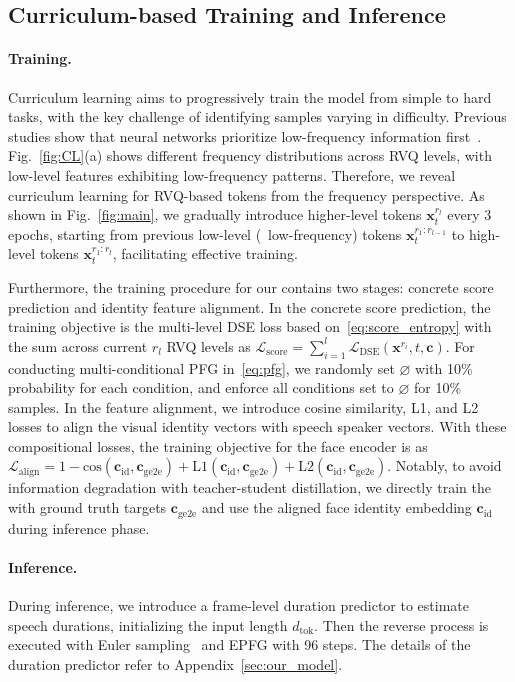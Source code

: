 \subsection{Curriculum-based Training and Inference}
\label{subsec:training}
\paragraph{Training.~~\xspace}
Curriculum learning aims to progressively train the model from simple to hard tasks, with the key challenge of identifying samples varying in difficulty.
Previous studies show that neural networks prioritize low-frequency information first~\cite{lowfreq_DBLP:conf/icml/RahamanBADLHBC19}. Fig.~\ref{fig:CL}(a) shows different frequency distributions across RVQ levels, with low-level features exhibiting low-frequency patterns. 
Therefore, we reveal curriculum learning for RVQ-based tokens from the frequency perspective. As shown in Fig.~\ref{fig:main}, we gradually introduce higher-level tokens $\bm{x}^{r_l}_t$ every 3 epochs, starting from previous low-level (\ie~low-frequency) tokens $\bm{x}^{r_1:r_{l-1}}_t$ to high-level tokens $\bm{x}^{r_1:r_l}_t$, facilitating effective training. 


Furthermore, the training procedure for our \methodname contains two stages: concrete score prediction and identity feature alignment. In the concrete score prediction, the training objective is the multi-level DSE loss based on~\cref{eq:score_entropy} with the sum across current $r_l$ RVQ levels as $\mathcal{L}_\text{score} = \sum_{i=1}^{l}\mathcal{L}_\text{DSE}(\bm{x}^{r_i},t,\bm{c})$. For conducting multi-conditional PFG in~\cref{eq:pfg}, we randomly set $\varnothing$ with 10\% probability for each condition, and enforce all conditions set to $\varnothing$ for 10\% samples. 
In the feature alignment, we introduce cosine similarity, L1, and L2 losses to align the visual identity vectors with speech speaker vectors. With these compositional losses, the training objective for the face encoder is as $\mathcal{L}_\text{align} = 1-\mathrm{cos}(\bm{c}_\text{id},\bm{c}_\text{ge2e}) + \mathrm{L1}(\bm{c}_\text{id},\bm{c}_\text{ge2e})+\mathrm{L2}(\bm{c}_\text{id},\bm{c}_\text{ge2e})$.
Notably, to avoid information degradation with teacher-student distillation, we directly train the \methodname with ground truth targets $\bm{c}_\text{ge2e}$ and use the aligned face identity embedding $\bm{c}_\text{id}$ during inference phase.



\paragraph{Inference.~~\xspace}
During inference, we introduce a frame-level duration predictor to estimate speech durations, initializing the input length $d_\text{tok}$. Then the reverse process is executed with Euler sampling~\cite{SEDD:conf/icml/LouME24} and EPFG with 96 steps. The details of the duration predictor refer to Appendix~\ref{sec:our_model}.
